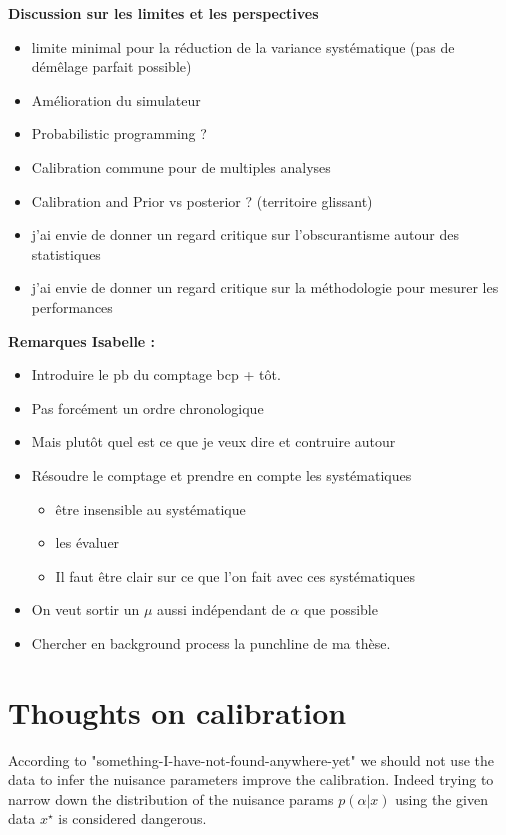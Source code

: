 \textbf{Discussion sur les limites et les perspectives}
\begin{itemize}
    \item limite minimal pour la réduction de la variance systématique (pas de démêlage parfait possible)
    \item Amélioration du simulateur
    \item Probabilistic programming ?
    \item Calibration commune pour de multiples analyses
    \item Calibration and Prior vs posterior ? (territoire glissant) 
    \item j'ai envie de donner un regard critique sur l'obscurantisme autour des statistiques
    \item j'ai envie de donner un regard critique sur la méthodologie pour mesurer les performances
\end{itemize}


\textbf{Remarques Isabelle : }
\begin{itemize}
    \item Introduire le pb du comptage bcp + tôt.
    \item Pas forcément un ordre chronologique
    \item Mais plutôt quel est ce que je veux dire et contruire autour 
    \item Résoudre le comptage et prendre en compte les systématiques
    \begin{itemize}
        \item être insensible au systématique
        \item les évaluer
        \item Il faut être clair sur ce que l'on fait avec ces systématiques
    \end{itemize}
    \item On veut sortir un $\mu$ aussi indépendant de $\alpha$ que possible
    \item Chercher en background process la punchline de ma thèse.
\end{itemize}



\section{Thoughts on calibration} %
\label{sec:thoughts_on_calibration}

According to "something-I-have-not-found-anywhere-yet" we should not use the data to infer the nuisance parameters \ie improve the calibration.
Indeed trying to narrow down the distribution of the nuisance params $p(\alpha|x)$ using the given data $x^\star$ is considered dangerous.


